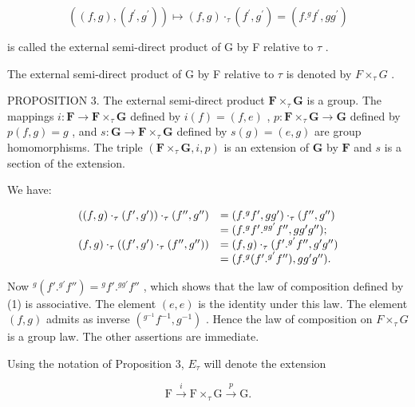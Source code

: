 \[
((f, g), (f ^ {\prime}, g ^ {\prime})) \mapsto (f, g) \cdot_ {\tau} (f ^ {\prime}, g ^ {\prime}) = (f. ^ {g} f ^ {\prime}, g g ^ {\prime})\tag{1}
\]

is called the external semi-direct product of G by F relative to \(\tau\) .

The external semi-direct product of G by F relative to \(\tau\) is denoted by \(F \times_{\tau} G\) .

PROPOSITION 3. The external semi-direct product \(\mathbf{F} \times_{\tau} \mathbf{G}\) is a group. The mappings \(i: \mathbf{F} \to \mathbf{F} \times_{\tau} \mathbf{G}\) defined by \(i(f) = (f, e)\) , \(p: \mathbf{F} \times_{\tau} \mathbf{G} \to \mathbf{G}\) defined by \(p(f, g) = g\) , and \(s: \mathbf{G} \to \mathbf{F} \times_{\tau} \mathbf{G}\) defined by \(s(g) = (e, g)\) are group homomorphisms. The triple \((\mathbf{F} \times_{\tau} \mathbf{G}, i, p)\) is an extension of \(\mathbf{G}\) by \(\mathbf{F}\) and \(s\) is a section of the extension.

We have:

\[
\begin{array}{r l} ((f, g) \cdot_ {\tau} (f ^ {\prime}, g ^ {\prime})) \cdot_ {\tau} (f ^ {\prime \prime}, g ^ {\prime \prime}) & = (f. ^ {g} f ^ {\prime}, g g ^ {\prime}) \cdot_ {\tau} (f ^ {\prime \prime}, g ^ {\prime \prime}) \\ & = (f. ^ {g} f ^ {\prime}. ^ {g g ^ {\prime}} f ^ {\prime \prime}, g g ^ {\prime} g ^ {\prime \prime}); \\ (f, g) \cdot_ {\tau} ((f ^ {\prime}, g ^ {\prime}) \cdot_ {\tau} (f ^ {\prime \prime}, g ^ {\prime \prime})) & = (f, g) \cdot_ {\tau} (f ^ {\prime}. ^ {g ^ {\prime}} f ^ {\prime \prime}, g ^ {\prime} g ^ {\prime \prime}) \\ & = (f. ^ {g} (f ^ {\prime}. ^ {g ^ {\prime}} f ^ {\prime \prime}), g g ^ {\prime} g ^ {\prime \prime}). \end{array}
\]

Now \({}^{g}(f'.{}^{g'}f'') = {}^{g}f'.{}^{gg'}f''\) , which shows that the law of composition defined by (1) is associative. The element \((e, e)\) is the identity under this law. The element \((f, g)\) admits as inverse \((^{g^{-1}}f^{-1}, g^{-1})\) . Hence the law of composition on \(F \times_{\tau} G\) is a group law. The other assertions are immediate.

Using the notation of Proposition 3, \(E_{\tau}\) will denote the extension

\[
\mathrm{F} \xrightarrow {i} \mathrm{F} \times_ {\tau} \mathrm{G} \xrightarrow {p} \mathrm{G}.
\]

